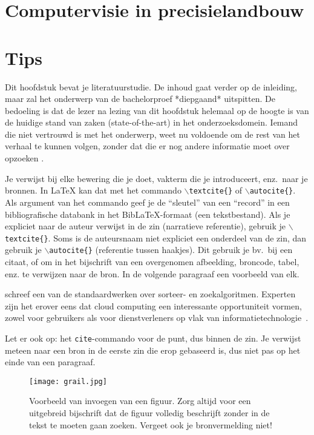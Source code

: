 \section{Computervisie in precisielandbouw}

\textcite{Radojcic2023}

\section{Tips}

Dit hoofdstuk bevat je literatuurstudie. De inhoud gaat verder op de inleiding, maar zal het onderwerp van de bachelorproef *diepgaand* uitspitten. De bedoeling is dat de lezer na lezing van dit hoofdstuk helemaal op de hoogte is van de huidige stand van zaken (state-of-the-art) in het onderzoeksdomein. Iemand die niet vertrouwd is met het onderwerp, weet nu voldoende om de rest van het verhaal te kunnen volgen, zonder dat die er nog andere informatie moet over opzoeken \autocite{Pollefliet2011}.

Je verwijst bij elke bewering die je doet, vakterm die je introduceert, enz.\ naar je bronnen. In \LaTeX{} kan dat met het commando \texttt{$\backslash${textcite\{\}}} of \texttt{$\backslash${autocite\{\}}}. Als argument van het commando geef je de ``sleutel'' van een ``record'' in een bibliografische databank in het Bib\LaTeX{}-formaat (een tekstbestand). Als je expliciet naar de auteur verwijst in de zin (narratieve referentie), gebruik je \texttt{$\backslash${}textcite\{\}}. Soms is de auteursnaam niet expliciet een onderdeel van de zin, dan gebruik je \texttt{$\backslash${}autocite\{\}} (referentie tussen haakjes). Dit gebruik je bv.~bij een citaat, of om in het bijschrift van een overgenomen afbeelding, broncode, tabel, enz. te verwijzen naar de bron. In de volgende paragraaf een voorbeeld van elk.

\textcite{Knuth1998} schreef een van de standaardwerken over sorteer- en zoekalgoritmen. Experten zijn het erover eens dat cloud computing een interessante opportuniteit vormen, zowel voor gebruikers als voor dienstverleners op vlak van informatietechnologie~\autocite{Creeger2009}.

Let er ook op: het \texttt{cite}-commando voor de punt, dus binnen de zin. Je verwijst meteen naar een bron in de eerste zin die erop gebaseerd is, dus niet pas op het einde van een paragraaf.

\begin{figure}
    \centering
    \texttt{[image: grail.jpg]}
    \caption[Voorbeeld figuur.]{\label{fig:grail}Voorbeeld van invoegen van een figuur. Zorg altijd voor een uitgebreid bijschrift dat de figuur volledig beschrijft zonder in de tekst te moeten gaan zoeken. Vergeet ook je bronvermelding niet!}
\end{figure}